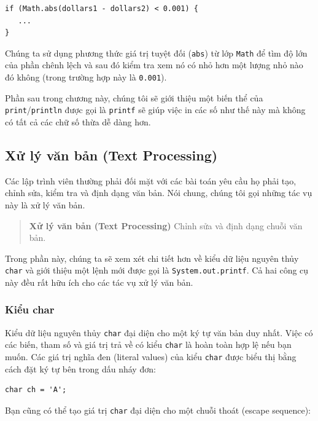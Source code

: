 \begin{verbatim}
if (Math.abs(dollars1 - dollars2) < 0.001) {
   ...
}
\end{verbatim}

Chúng ta sử dụng phương thức giá trị tuyệt đối (\texttt{abs}) từ lớp
\texttt{Math} để tìm độ lớn của phần chênh lệch và sau đó kiểm tra xem
nó có nhỏ hơn một lượng nhỏ nào đó không (trong trường hợp này là
\texttt{0.001}).

Phần sau trong chương này, chúng tôi sẽ giới thiệu một biến thể của
\texttt{print}/\texttt{println} được gọi là \texttt{printf} sẽ giúp việc
in các số như thế này mà không có tất cả các chữ số thừa dễ dàng hơn.

\subsection{Xử lý văn bản (Text
Processing)}\label{xux1eed-luxfd-vux103n-bux1ea3n-text-processing-1}

Các lập trình viên thường phải đối mặt với các bài toán yêu cầu họ phải
tạo, chỉnh sửa, kiểm tra và định dạng văn bản. Nói chung, chúng tôi gọi
những tác vụ này là xử lý văn bản.

\begin{quote}
\textbf{Xử lý văn bản (Text Processing)} Chỉnh sửa và định dạng chuỗi
văn bản.
\end{quote}

Trong phần này, chúng ta sẽ xem xét chi tiết hơn về kiểu dữ liệu nguyên
thủy \texttt{char} và giới thiệu một lệnh mới được gọi là
\texttt{System.out.printf}. Cả hai công cụ này đều rất hữu ích cho các
tác vụ xử lý văn bản.

\subsubsection{Kiểu char}\label{kiux1ec3u-char}

Kiểu dữ liệu nguyên thủy \texttt{char} đại diện cho một ký tự văn bản
duy nhất. Việc có các biến, tham số và giá trị trả về có kiểu
\texttt{char} là hoàn toàn hợp lệ nếu bạn muốn. Các giá trị nghĩa đen
(literal values) của kiểu \texttt{char} được biểu thị bằng cách đặt ký
tự bên trong dấu nháy đơn:

\begin{verbatim}
char ch = 'A';
\end{verbatim}

Bạn cũng có thể tạo giá trị \texttt{char} đại diện cho một chuỗi thoát
(escape sequence):

